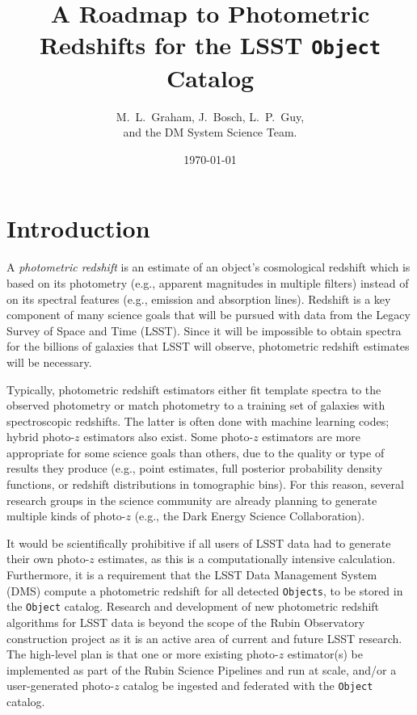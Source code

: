 \documentclass[DM,lsstdraft,toc]{lsstdoc}
\title[Photo-$z$ for LSST Objects]{A Roadmap to Photometric Redshifts for the LSST {\tt Object} Catalog}
\author{M.~L.~Graham, J.~Bosch, L.~P.~Guy, \\ and the DM System Science Team.}
\date{\today}
\begin{document}
\maketitle



\section{Introduction} \label{sec:intro}

A {\it photometric redshift} is an estimate of an object's cosmological redshift which is based on its photometry (e.g., apparent magnitudes in multiple filters) instead of on its spectral features (e.g., emission and absorption lines). 
Redshift is a key component of many science goals that will be pursued with data from the Legacy Survey of Space and Time (LSST).
Since it will be impossible to obtain spectra for the billions of galaxies that LSST will observe, photometric redshift estimates will be necessary.

Typically, photometric redshift estimators either fit template spectra to the observed photometry or match photometry to a training set of galaxies with spectroscopic redshifts. 
The latter is often done with machine learning codes;  hybrid photo-$z$ estimators also exist. 
Some photo-$z$ estimators are more appropriate for some science goals than others, due to the quality or type of results they produce (e.g., point estimates, full posterior probability density functions, or redshift distributions in tomographic bins).
For this reason, several research groups in the science community are already planning to generate multiple kinds of photo-$z$ (e.g., the Dark Energy Science Collaboration).

It would be scientifically prohibitive if all users of LSST data had to generate their own photo-$z$ estimates, as this is a computationally intensive calculation.
Furthermore, it is a requirement that the LSST Data Management System (DMS) compute a photometric redshift for all detected {\tt Objects}, to be stored in the {\tt Object} catalog. 
Research and development of new photometric redshift algorithms for LSST data is beyond the scope of the Rubin Observatory construction project as it is an active area of current and future LSST research.
The high-level plan is that one or more existing photo-$z$ estimator(s) be implemented as part of the Rubin Science Pipelines and run at scale, and/or a user-generated photo-$z$ catalog be ingested and federated with the {\tt Object} catalog.
\end{document}
